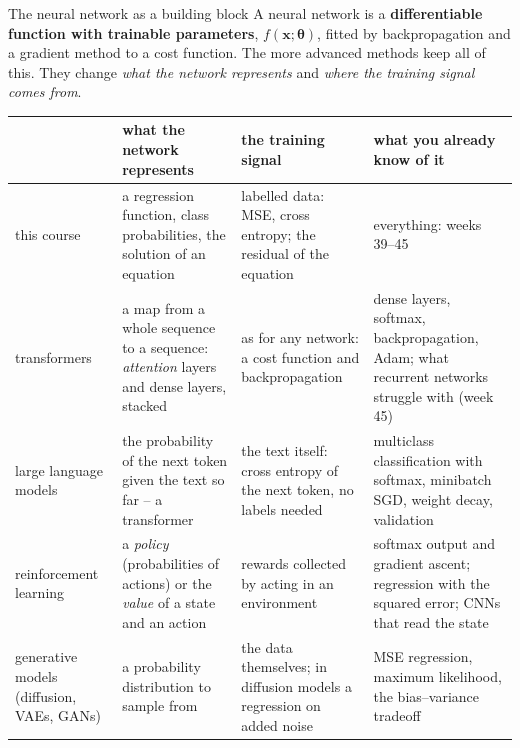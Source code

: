 \documentclass[10pt,aspectratio=169]{beamer}
\begin{document}
\begin{frame}{The neural network as a building block}
\small
A neural network is a \textbf{differentiable function with trainable
parameters}, $f(\bm{x};\bm{\theta})$, fitted by backpropagation and a
gradient method to a cost function.  The more advanced methods keep all of
this.  They change \emph{what the network represents} and \emph{where the
training signal comes from}.

\medskip
\centering
\scriptsize
\setlength{\tabcolsep}{4pt}
\begin{tabular}{@{}L{2.5cm}L{3.5cm}L{3.6cm}L{3.6cm}@{}}
\toprule
 & what the network represents & the training signal & what you already know of it\\
\midrule
this course & a regression function, class probabilities, the solution of an equation &
  labelled data: MSE, cross entropy; the residual of the equation &
  everything: weeks 39--45\\
\addlinespace[1.5pt]
transformers & a map from a whole sequence to a sequence: \emph{attention} layers and dense layers, stacked &
  as for any network: a cost function and backpropagation &
  dense layers, softmax, backpropagation, Adam; what recurrent networks struggle with (week 45)\\
\addlinespace[1.5pt]
large language models & the probability of the next token given the text so far -- a transformer &
  the text itself: cross entropy of the next token, no labels needed &
  multiclass classification with softmax, minibatch SGD, weight decay, validation\\
\addlinespace[1.5pt]
reinforcement learning & a \emph{policy} (probabilities of actions) or the \emph{value} of a state and an action &
  rewards collected by acting in an environment &
  softmax output and gradient ascent; regression with the squared error; CNNs that read the state\\
\addlinespace[1.5pt]
generative models (diffusion, VAEs, GANs) & a probability distribution to sample from &
  the data themselves; in diffusion models a regression on added noise &
  MSE regression, maximum likelihood, the bias--variance tradeoff\\
\bottomrule
\end{tabular}
\end{frame}
\end{document}
